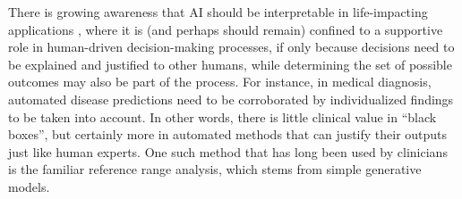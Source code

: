 \documentclass[english]{scrartcl}
\begin{document}

There is growing awareness that AI should be interpretable in life-impacting applications \cite{Molnar-18}, where it is (and perhaps should remain) confined to a supportive role in human-driven decision-making processes, if only because decisions need to be explained and justified to other humans, while determining the set of possible outcomes may also be part of the process. For instance, in medical diagnosis, automated disease predictions need to be corroborated by individualized findings to be taken into account. In other words, there is little clinical value in ``black boxes'', but certainly more in automated methods that can justify their outputs just like human experts. One such method that has long been used by clinicians is the familiar reference range analysis, which stems from simple generative models.


\end{document}
